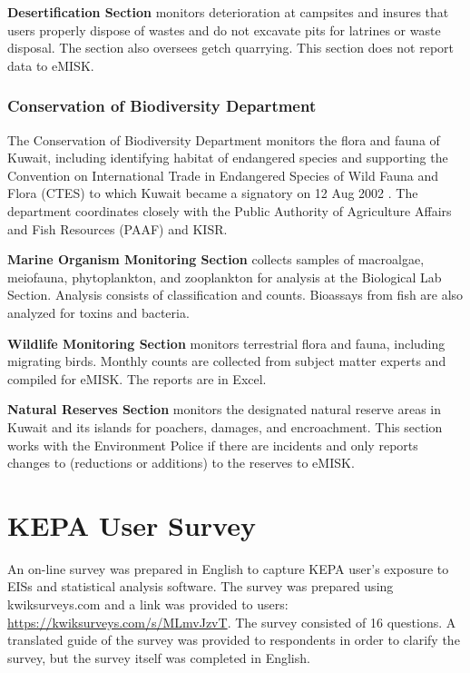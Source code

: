 \textbf{Desertification Section} monitors deterioration at campsites and insures that users properly dispose of wastes and do not excavate pits for latrines or waste disposal. The section also oversees getch quarrying. This section does not report data to eMISK.

\subsubsection{Conservation of Biodiversity Department}

The Conservation of Biodiversity Department monitors the flora and fauna of Kuwait, including identifying habitat of endangered species and supporting the Convention on International Trade in Endangered Species of Wild Fauna and Flora (CTES) to which Kuwait became a signatory on 12 Aug 2002 \citep{cites2002}. The department coordinates closely with the Public Authority of Agriculture Affairs and Fish Resources (PAAF) and KISR.

\textbf{Marine Organism Monitoring Section} collects samples of macroalgae, meiofauna, phytoplankton, and zooplankton for analysis at the Biological Lab Section. Analysis consists of classification and counts. Bioassays from fish are also analyzed for toxins and bacteria.

\textbf{Wildlife Monitoring Section} monitors terrestrial flora and fauna, including migrating birds. Monthly counts are collected from subject matter experts and compiled for eMISK. The reports are in Excel.

\textbf{Natural Reserves Section} monitors the designated natural reserve areas in Kuwait and its islands for poachers, damages, and encroachment. This section works with the Environment Police if there are incidents and only reports changes to (reductions or additions) to the reserves to eMISK.


\section{KEPA User Survey}
An on-line survey was prepared in English to capture KEPA user's exposure to EISs and statistical analysis software. The survey was prepared using kwiksurveys.com and a link was provided to users: \url{https://kwiksurveys.com/s/MLmvJzvT}. The survey consisted of 16 questions. A translated guide of the survey was provided to respondents in order to clarify the survey, but the survey itself was completed in English.

